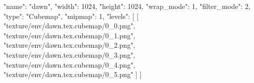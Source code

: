 {
  "name": "dawn",
  "width": 1024,
  "height": 1024,
  "wrap_mode": 1,
  "filter_mode": 2,
  "type": "Cubemap",
  "mipmap": 1,
  "levels": [
    [
      "texture/env/dawn.tex.cubemap/0_0.png",
      "texture/env/dawn.tex.cubemap/0_1.png",
      "texture/env/dawn.tex.cubemap/0_2.png",
      "texture/env/dawn.tex.cubemap/0_3.png",
      "texture/env/dawn.tex.cubemap/0_4.png",
      "texture/env/dawn.tex.cubemap/0_5.png"
    ]
  ]
}